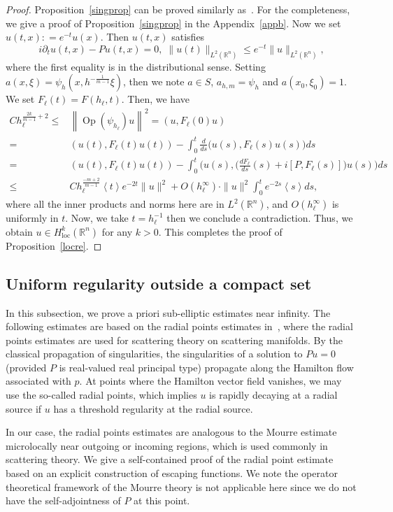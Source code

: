 \documentclass[AHL,Unicode,longabstracts,published]{cedram}
\newcommand*\g{\psi}
\newcommand*\x{\xi}
\DeclareMathOperator{\Op}{Op}
\newcommand*\re{\mathbb{R}}
\newcommand*\pa{\partial}
\newcommand*\coloneqq{\mathrel{\mathop:}=}
\DeclareMathOperator{\loc}{loc}
\newcommand{\jap}[1]{\left\langle #1 \right\rangle}
\newcommand{\bigpare}[1]{\bigl(#1\bigr)}
\newcommand{\biggpare}[1]{\biggl(#1\biggr)}
\begin{document}
\begin{proof}
Proposition~\ref{singprop} can be proved similarly as~\cite[Lemma~9]{N}. For the completeness, we give a proof of Proposition~\ref{singprop} in the Appendix~\ref{appb}. Now we set $u(t, x) \coloneqq e^{-t}u(x) $. Then $u(t,x)$ satisfies
\[
i\pa_tu(t,x) - Pu(t,x) = 0,\;\|u(t) \|_{L^2(\re^n)} \leq e^{-t}\|u\|_{L^2(\re^n)},
\]
where the first equality is in the distributional sense. Setting $a(x,\x)=\g_h(x,h^{-\frac{1}{m-1}}\x)$, then we note $a\in S$, $a_{h,m}=\g_h$ and $a(x_0,\x_0)=1$. We set $F_{\ell}(t) = F(h_{\ell},t)$. Then, we have
\begin{align*}
Ch_{\ell}^{\frac{2k}{m-1}+2} \leq & \left\|\Op(\g_{h_{\ell}})u\right\|^2=(u, F_{\ell}(0)u)\\
= & \left(u(t), F_{\ell}(t)u(t)\right)- \int_0^t \frac{d}{ds}\bigpare{u(s), F_{\ell}(s)u(s)}ds\\
= & \left(u(t), F_{\ell}(t)u(t)\right) - \int_0^t \biggpare{u(s), \biggpare{\frac{dF_{\ell}}{ds}(s) + i[P, F_{\ell}(s)]}u(s)} ds\\
\leq & Ch_{\ell}^{\frac{-m+2}{m-1}}\jap{t}e^{-2t}\|u\|^2 + O(h_{\ell}^{\infty})\cdot \|u\|^2 \int_0^te^{-2s}\jap{s}ds,
\end{align*}
where all the inner products and norms here are in $L^2(\re^n)$, and $O(h_{\ell}^{\infty})$ is uniformly in $t$. Now, we take $t = h_{\ell}^{-1}$ then we conclude a contradiction. Thus, we obtain $u\in H^k_{\loc}(\re^n)$ for any $k>0$. This completes the proof of Proposition~\ref{locre}.
\end{proof}



\subsection{Uniform regularity outside a compact set}\label{global}

In this subsection, we prove a priori sub-elliptic estimates near infinity. The following estimates are based on the radial points estimates in~\cite{M}, where the radial points estimates are used for scattering theory on scattering manifolds. By the classical propagation of singularities, the singularities of a solution to $Pu=0$ (provided $P$ is real-valued real principal type) propagate along the Hamilton flow associated with $p$. At points where the Hamilton vector field vanishes, we may use the so-called radial points, which implies $u$ is rapidly decaying at a radial source if $u$ has a threshold regularity at the radial source.

In our case, the radial points estimates are analogous to the Mourre estimate microlocally near outgoing or incoming regions, which is used commonly in scattering theory. We give a self-contained proof of the radial point estimate based on an explicit construction of escaping functions. We note the operator theoretical framework of the Mourre theory is not applicable here since we do not have the self-adjointness of $P$ at this point.
\end{document}
